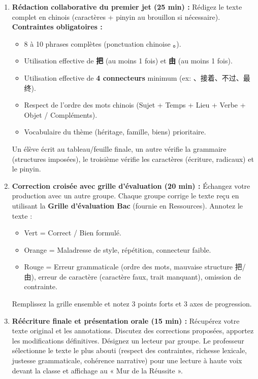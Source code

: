 \documentclass[11pt]{article}
\newcommand{\cle}[1]{{\popxbold\color{popdark}#1}}
\newcommand{\zh}[1]{\ifmmode\text{#1}\else{#1}\fi}
\begin{document}
\begin{enumerate}
    \item \textbf{Rédaction collaborative du premier jet (25 min) :} 
    Rédigez le texte complet en chinois (caractères + pinyin au brouillon si nécessaire). 
    \textbf{Contraintes obligatoires :}
    \begin{itemize}
        \item 8 à 10 phrases complètes (ponctuation chinoise 。).
        \item Utilisation effective de \textbf{把} (au moins 1 fois) et \textbf{由} (au moins 1 fois).
        \item Utilisation effective de \textbf{4 connecteurs} minimum (ex: \zh{首先}、\cle{接着}、\cle{不过}、\cle{最终}).
        \item Respect de l'ordre des mots chinois (Sujet + Temps + Lieu + Verbe + Objet / Compléments).
        \item Vocabulaire du thème (héritage, famille, biens) prioritaire.
    \end{itemize}
    Un élève écrit au tableau/feuille finale, un autre vérifie la grammaire (structures imposées), le troisième vérifie les caractères (écriture, radicaux) et le pinyin.

    \item \textbf{Correction croisée avec grille d'évaluation (20 min) :} 
    Échangez votre production avec un autre groupe. Chaque groupe corrige le texte reçu en utilisant la \textbf{Grille d'évaluation Bac} (fournie en Ressources). 
    Annotez le texte : 
    \begin{itemize}
        \item \textcolor{popgreen}{Vert} = Correct / Bien formulé.
        \item \textcolor{poporange}{Orange} = Maladresse de style, répétition, connecteur faible.
        \item \textcolor{poppink}{Rouge} = Erreur grammaticale (ordre des mots, mauvaise structure \cle{把}/\cle{由}), erreur de caractère (caractère faux, trait manquant), omission de contrainte.
    \end{itemize}
    Remplissez la grille ensemble et notez 3 points forts et 3 axes de progression.

    \item \textbf{Réécriture finale et présentation orale (15 min) :} 
    Récupérez votre texte original et les annotations. Discutez des corrections proposées, apportez les modifications définitives. 
    Désignez un lecteur par groupe. Le professeur sélectionne le texte le plus abouti (respect des contraintes, richesse lexicale, justesse grammaticale, cohérence narrative) pour une lecture à haute voix devant la classe et affichage au « Mur de la Réussite ».
\end{enumerate}
\end{document}
